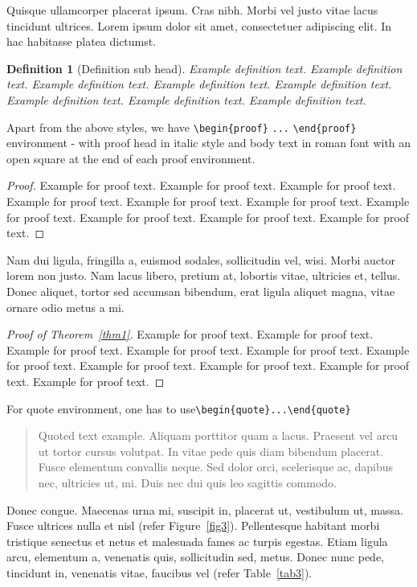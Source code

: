 \documentclass[unnumsec,webpdf,contemporary,large]{oup-authoring-template}%
\theoremstyle{thmstyleone}%
\theoremstyle{thmstyletwo}%
\theoremstyle{thmstylethree}%
\newtheorem{definition}{Definition}
\begin{document}
Quisque ullamcorper placerat ipsum. Cras nibh. Morbi vel justo vitae lacus tincidunt ultrices. Lorem ipsum dolor sit
amet, consectetuer adipiscing elit. In hac habitasse platea dictumst.

\begin{definition}[Definition sub head]
Example definition text. Example definition text. Example definition text. Example definition text. Example definition text. Example definition text. Example definition text. Example definition text.
\end{definition}

Apart from the above styles, we have \verb+\begin{proof}+ \verb+...+ \verb+\end{proof}+ environment - with proof head in italic style and body text in roman font with an open square at the end of each proof environment.

\begin{proof}Example for proof text. Example for proof text. Example for proof text. Example for proof text. Example for proof text. Example for proof text. Example for proof text. Example for proof text. Example for proof text. Example for proof text.
\end{proof}

Nam dui ligula, fringilla a, euismod sodales, sollicitudin vel, wisi. Morbi auctor lorem non justo. Nam lacus libero,
pretium at, lobortis vitae, ultricies et, tellus. Donec aliquet, tortor sed accumsan bibendum, erat ligula aliquet magna,
vitae ornare odio metus a mi.

\begin{proof}[Proof of Theorem~{\upshape\ref{thm1}}]
Example for proof text. Example for proof text. Example for proof text. Example for proof text. Example for proof text. Example for proof text. Example for proof text. Example for proof text. Example for proof text. Example for proof text.
\end{proof}

\noindent
For quote environment, one has to use\newline \verb+\begin{quote}...\end{quote}+
\begin{quote}
Quoted text example. Aliquam porttitor quam a lacus. Praesent vel arcu ut tortor cursus volutpat. In vitae pede quis diam bibendum placerat. Fusce elementum
convallis neque. Sed dolor orci, scelerisque ac, dapibus nec, ultricies ut, mi. Duis nec dui quis leo sagittis commodo.
\end{quote}
Donec congue. Maecenas urna mi, suscipit in, placerat ut, vestibulum ut, massa. Fusce ultrices nulla et nisl (refer Figure~\ref{fig3}). Pellentesque habitant morbi tristique senectus et netus et malesuada fames ac turpis egestas. Etiam ligula arcu,
elementum a, venenatis quis, sollicitudin sed, metus. Donec nunc pede, tincidunt in, venenatis vitae, faucibus vel (refer Table~\ref{tab3}).
\end{document}

